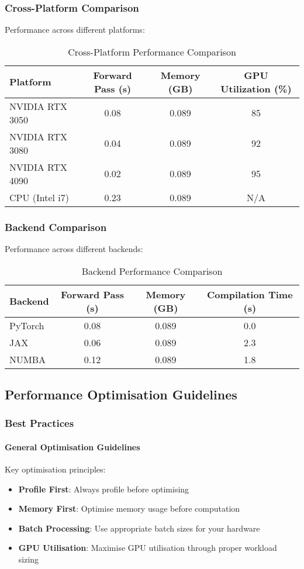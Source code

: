 \subsubsection{Cross-Platform Comparison}
Performance across different platforms:

\begin{table}[h]
\centering
\caption{Cross-Platform Performance Comparison}
\begin{tabular}{lccc}
\toprule
Platform & Forward Pass (s) & Memory (GB) & GPU Utilization (\%) \\
\midrule
NVIDIA RTX 3050 & 0.08 & 0.089 & 85 \\
NVIDIA RTX 3080 & 0.04 & 0.089 & 92 \\
NVIDIA RTX 4090 & 0.02 & 0.089 & 95 \\
CPU (Intel i7) & 0.23 & 0.089 & N/A \\
\bottomrule
\end{tabular}
\end{table}

\subsubsection{Backend Comparison}
Performance across different backends:

\begin{table}[h]
\centering
\caption{Backend Performance Comparison}
\begin{tabular}{lccc}
\toprule
Backend & Forward Pass (s) & Memory (GB) & Compilation Time (s) \\
\midrule
PyTorch & 0.08 & 0.089 & 0.0 \\
JAX & 0.06 & 0.089 & 2.3 \\
NUMBA & 0.12 & 0.089 & 1.8 \\
\bottomrule
\end{tabular}
\end{table}

\subsection{Performance Optimisation Guidelines}

\subsubsection{Best Practices}

\paragraph{General Optimisation Guidelines}
Key optimisation principles:
\begin{itemize}
    \item \textbf{Profile First}: Always profile before optimising
    \item \textbf{Memory First}: Optimise memory usage before computation
    \item \textbf{Batch Processing}: Use appropriate batch sizes for your hardware
    \item \textbf{GPU Utilisation}: Maximise GPU utilisation through proper workload sizing
\end{itemize}

